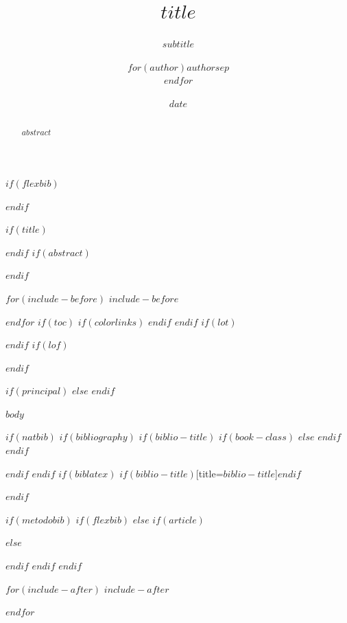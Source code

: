\documentclass[$if(fontsize)$$fontsize$,a4paper,$endif$$if(article)$oneside,$endif$$if(lang)$$babel-lang$,$endif$$if(papersize)$$papersize$paper,$endif$$for(classoption)$$classoption$$sep$,$endfor$]{$documentclass$}
\title{$title$}
\title{}
\subtitle{$subtitle$}
\author{$for(author)$$author$$sep$ \\ $endfor$}
\author{}
\date{$date$}
\date{}
\numberwithin{dummy}{section}
\theoremstyle{ocrenumbox}
\theoremstyle{blacknumex}
\theoremstyle{blacknumbox}
\theoremstyle{ocrenum}
\numberwithin{dummy}{section}
\theoremstyle{ocrenumbox}
\theoremstyle{blacknumex}
\theoremstyle{blacknumbox}
\theoremstyle{ocrenum}
\theoremstyle{ocrenum}
\begin{document}
$if(flexbib)$

$endif$

$if(title)$
\maketitle
$endif$
$if(abstract)$
\begin{abstract}
$abstract$
\end{abstract}
$endif$

$for(include-before)$
$include-before$

$endfor$
$if(toc)$
{
$if(colorlinks)$
\hypersetup{linkcolor=$if(toccolor)$$toccolor$$else$black$endif$}
$endif$
\setcounter{tocdepth}{$toc-depth$}
\tableofcontents
}
$endif$
$if(lot)$
\listoftables
$endif$
$if(lof)$
\listoffigures
$endif$

$if(principal)$
$else$
\raggedbottom
$endif$

$body$

$if(natbib)$
$if(bibliography)$
$if(biblio-title)$
$if(book-class)$
\renewcommand\bibname{$biblio-title$}
$else$
\renewcommand\refname{$biblio-title$}
$endif$
$endif$


$endif$
$endif$
$if(biblatex)$
\printbibliography$if(biblio-title)$[title=$biblio-title$]$endif$

$endif$

$if(metodobib)$
$if(flexbib)$
%
$else$
$if(article)$
$else$
$endif$
$endif$
$endif$

$for(include-after)$
$include-after$

$endfor$
\end{document}
